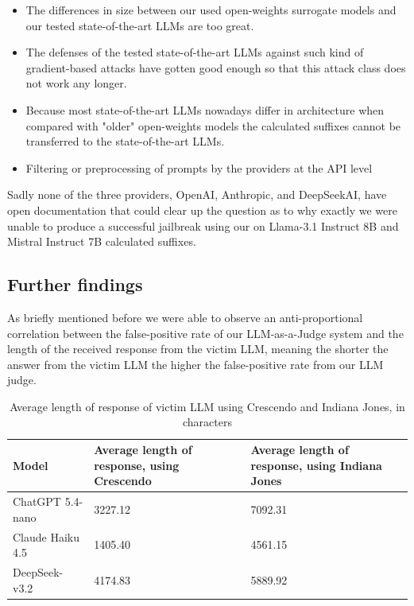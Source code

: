 \documentclass[11pt,a4paper,twocolumn]{article}
\begin{document}
	\begin{itemize}
		\item The differences in size between our used open-weights surrogate models and our tested state-of-the-art LLMs are too great.
		
		\item The defenses of the tested state-of-the-art LLMs against such kind of gradient-based attacks have gotten good enough so that this attack class does not work any longer.
		
		\item Because most state-of-the-art LLMs nowadays differ in architecture when compared with "older" open-weights models the calculated suffixes cannot be transferred to the state-of-the-art LLMs.
		
		\item Filtering or preprocessing of prompts by the providers at the API level
	\end{itemize}
	
	Sadly none of the three providers, OpenAI, Anthropic, and DeepSeekAI, have open documentation that could clear up the question as to why exactly we were unable to produce a successful jailbreak using our on Llama-3.1 Instruct 8B and Mistral Instruct 7B calculated suffixes.
	
	\subsection{Further findings}
	\label{sec:furtherfindings}
	
	As briefly mentioned before we were able to observe an anti-proportional correlation between the false-positive rate of our LLM-as-a-Judge system and the length of the received response from the victim LLM, meaning the shorter the answer from the victim LLM the higher the false-positive rate from our LLM judge.
	
	\begin{table}
		\centering
		\begin{tabularx}{\linewidth}{l X X}
			\hline
			\textbf{Model} &
			\textbf{Average length of response, using Crescendo} &
			\textbf{Average length of response, using Indiana Jones}\\
			\hline
			
			ChatGPT 5.4-nano & 3227.12 & 7092.31 \\
			Claude Haiku 4.5 & 1405.40 & 4561.15 \\
			DeepSeek-v3.2 & 4174.83 & 5889.92 \\
			
			\hline
		\end{tabularx}
		\caption{Average length of response of victim LLM using Crescendo and Indiana Jones, in characters}
		\label{tab:responses_length}
	\end{table}
	
\end{document}
